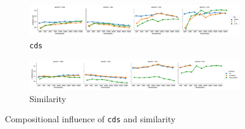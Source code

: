 \begin{figure}
  \centering

  \begin{subfigure}[t]{\textwidth}
    \includegraphics[width=1.1\textwidth]{supplement/figures/compositional-interaction-cds}

  \caption{\texttt{cds}}
  \label{fig:compositional-cds}
  \end{subfigure}

  \begin{subfigure}[t]{\textwidth}
    \includegraphics[width=1.1\textwidth]{supplement/figures/compositional-interaction-similarity}

  \caption{Similarity}
  \label{fig:compositional-similarity}
  \end{subfigure}

  \caption{Compositional influence of \texttt{cds} and similarity}
\end{figure}
